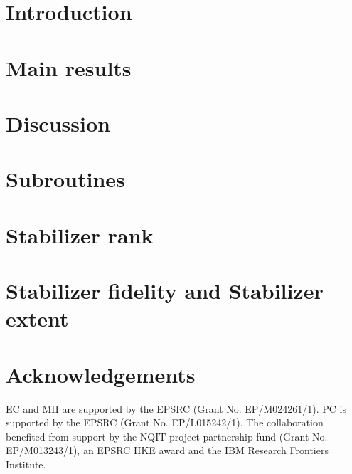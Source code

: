 \documentclass[a4paper,aps, noarxiv,onecolumn, accepted=2019-06-19]{quantumarticle}
\begin{document}
\maketitle
\tableofcontents

\section{Introduction}


\section{Main results}


\section{Discussion}
\label{discussion}



\section{Subroutines}
\label{algorithms}


\section{Stabilizer rank}


\section{Stabilizer fidelity and Stabilizer extent}


\section{Acknowledgements}

EC and MH are supported by the EPSRC (Grant No. EP/M024261/1). PC is supported by the EPSRC (Grant No. EP/L015242/1). The collaboration benefited from support by the NQIT project partnership fund (Grant No. EP/M013243/1), an EPSRC IIKE award and the IBM Research Frontiers Institute.

%

\end{document}

